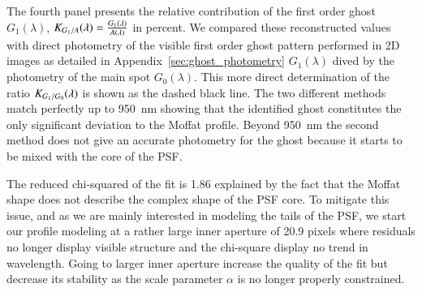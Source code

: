 The fourth panel presents the relative contribution of the first order
ghost $G_1(\lambda)$,
$K_{G_1/A}(\lambda) = \frac{G_1(\lambda)}{A(\lambda)}$ in
percent. We compared these reconstructed values with direct photometry
of the visible first order ghost pattern performed in 2D images as
detailed in Appendix~\ref{sec:ghost_photometry} $G_1(\lambda)$ dived
by the photometry of the main spot $G_0(\lambda)$. This more direct
determination of the ratio $K_{G_1/G_0}(\lambda)$ is shown as the dashed black
line. The two different methods match perfectly up to \SI{950}{nm}
showing that the identified ghost constitutes the only significant
deviation to the Moffat profile. Beyond \SI{950}{nm} the second method
does not give an accurate photometry for the ghost because it starts
to be mixed with the core of the PSF.


The reduced chi-squared of the fit is 1.86 explained by the fact that
the Moffat shape does not describe the complex shape of the PSF
core. To mitigate this issue, and as we are mainly interested in
modeling the tails of the PSF, we start our profile modeling at a
rather large inner aperture of 20.9 pixels where residuals no longer
display visible structure and the chi-square display no trend in
wavelength. Going to larger inner aperture increase the quality of the
fit but decrease its stability as the scale parameter $\alpha$ is no
longer properly constrained.

